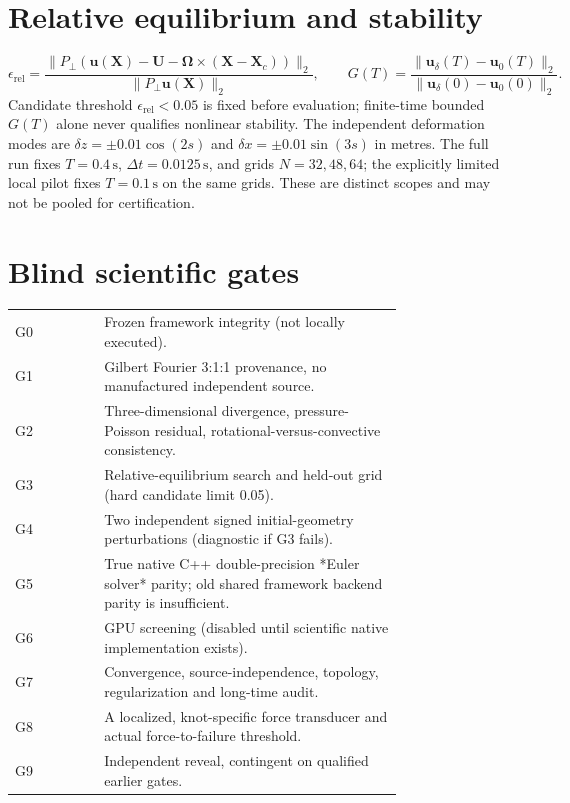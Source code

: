 \documentclass[11pt,a4paper]{article}
\begin{document}
\section{Relative equilibrium and stability}
\begin{equation}
\epsilon_{\mathrm{rel}}=\frac{\lVert P_{\perp}(\mathbf u(\mathbf X)-\mathbf U-\boldsymbol\Omega\times(\mathbf X-\mathbf X_c))\rVert_2}{\lVert P_{\perp}\mathbf u(\mathbf X)\rVert_2},
\qquad G(T)=\frac{\lVert\mathbf u_{\delta}(T)-\mathbf u_0(T)\rVert_2}{\lVert\mathbf u_{\delta}(0)-\mathbf u_0(0)\rVert_2}.
\end{equation}
Candidate threshold $\epsilon_{\mathrm{rel}}<0.05$ is fixed before evaluation; finite-time bounded $G(T)$ alone never qualifies nonlinear stability. The independent deformation modes are $\delta z=\pm0.01\cos(2s)$ and $\delta x=\pm0.01\sin(3s)$ in metres. The full run fixes $T=0.4\,\mathrm s$, $\Delta t=0.0125\,\mathrm s$, and grids $N=32,48,64$; the explicitly limited local pilot fixes $T=0.1\,\mathrm s$ on the same grids. These are distinct scopes and may not be pooled for certification.
\section{Blind scientific gates}
\begin{longtable}{lp{0.77\linewidth}}\toprule
G0 & Frozen framework integrity (not locally executed).\\
G1 & Gilbert Fourier 3:1:1 provenance, no manufactured independent source.\\
G2 & Three-dimensional divergence, pressure-Poisson residual, rotational-versus-convective consistency.\\
G3 & Relative-equilibrium search and held-out grid (hard candidate limit 0.05).\\
G4 & Two independent signed initial-geometry perturbations (diagnostic if G3 fails).\\
G5 & True native C++ double-precision *Euler solver* parity; old shared framework backend parity is insufficient.\\
G6 & GPU screening (disabled until scientific native implementation exists).\\
G7 & Convergence, source-independence, topology, regularization and long-time audit.\\
G8 & A localized, knot-specific force transducer and actual force-to-failure threshold.\\
G9 & Independent reveal, contingent on qualified earlier gates.\\
\bottomrule\end{longtable}
\end{document}
